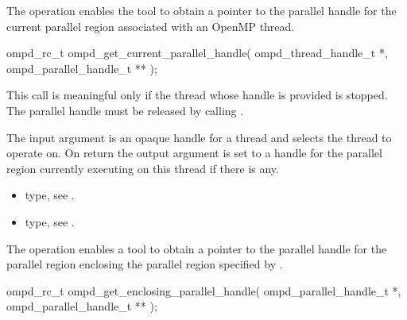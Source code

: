 \label{subsubsubsec:ompd_get_current_parallel_handle}
\summary
The   operation enables the tool to obtain a pointer to 
the parallel handle for the current parallel region associated with an OpenMP thread.

\format

\begin{cspecific}
\begin{ompSyntax}
ompd_rc_t ompd_get_current_parallel_handle(
  ompd_thread_handle_t *,
  ompd_parallel_handle_t **
);
\end{ompSyntax}
\end{cspecific}


\descr
This call is meaningful only if the thread whose handle is provided is stopped. The parallel handle 
must be released by calling .

\argdesc
The input argument  is an opaque handle for a thread and selects the thread to operate on.
On return the output argument  is set to a handle for the parallel region
currently executing on this thread if there is any.

\crossreferences
\begin{itemize}
	\item {} type, see .
	\item {} type, see .
\end{itemize}

\label{subsubsubsec:ompd_get_enclosing_parallel_handle}
\summary
The    operation enables a tool to obtain a 
pointer to the parallel handle for the parallel region enclosing the parallel region specified by 
.

\format

\begin{cspecific}
\begin{ompSyntax}
ompd_rc_t ompd_get_enclosing_parallel_handle(
  ompd_parallel_handle_t *,
  ompd_parallel_handle_t **
);
\end{ompSyntax}
\end{cspecific}



